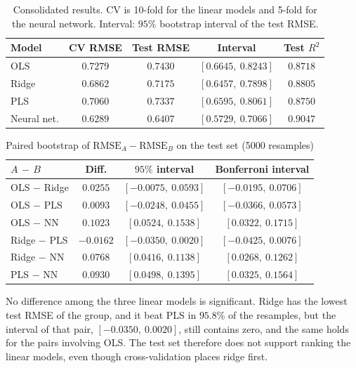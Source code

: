 \documentclass[conference]{IEEEtran}
\begin{document}
\begin{table}[htbp]
\caption{Consolidated results. CV is 10-fold for the linear models and
5-fold for the neural network. Interval: $95\%$ bootstrap interval of
the test RMSE.}
\label{tab:models}
\centering
\setlength{\tabcolsep}{4pt}
\begin{tabular}{lcccc}
\toprule
Model & CV RMSE & Test RMSE & Interval & Test $R^2$ \\
\midrule
OLS & $0.7279$ & $0.7430$ & $[0.6645,\ 0.8243]$ & $0.8718$ \\
Ridge & $0.6862$ & $0.7175$ & $[0.6457,\ 0.7898]$ & $0.8805$ \\
PLS & $0.7060$ & $0.7337$ & $[0.6595,\ 0.8061]$ & $0.8750$ \\
Neural net. & $0.6289$ & $0.6407$ & $[0.5729,\ 0.7066]$ & $0.9047$ \\
\bottomrule
\end{tabular}
\end{table}

\begin{table}[htbp]
\caption{Paired bootstrap of $\mathrm{RMSE}_A - \mathrm{RMSE}_B$ on the
test set (5000 resamples)}
\label{tab:pairs}
\centering
\setlength{\tabcolsep}{4pt}
\begin{tabular}{lccc}
\toprule
$A$ $-$ $B$ & Diff. & $95\%$ interval & Bonferroni interval \\
\midrule
OLS $-$ Ridge & $0.0255$ & $[-0.0075,\ 0.0593]$ & $[-0.0195,\ 0.0706]$ \\
OLS $-$ PLS & $0.0093$ & $[-0.0248,\ 0.0455]$ & $[-0.0366,\ 0.0573]$ \\
OLS $-$ NN & $0.1023$ & $[0.0524,\ 0.1538]$ & $[0.0322,\ 0.1715]$ \\
Ridge $-$ PLS & $-0.0162$ & $[-0.0350,\ 0.0020]$ & $[-0.0425,\ 0.0076]$ \\
Ridge $-$ NN & $0.0768$ & $[0.0416,\ 0.1138]$ & $[0.0268,\ 0.1262]$ \\
PLS $-$ NN & $0.0930$ & $[0.0498,\ 0.1395]$ & $[0.0325,\ 0.1564]$ \\
\bottomrule
\end{tabular}
\end{table}

No difference among the three linear models is significant. Ridge has
the lowest test RMSE of the group, and it beat PLS in $95.8\%$ of the
resamples, but the interval of that pair, $[-0.0350,\ 0.0020]$, still
contains zero, and the same holds for the pairs involving OLS. The test
set therefore does not support ranking the linear models, even though
cross-validation places ridge first.
\end{document}
